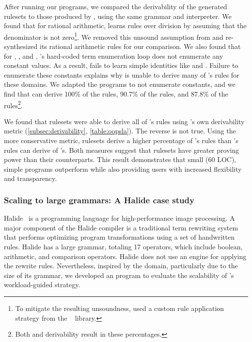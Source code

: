 After running our \enumo programs,
we compared the derivability of the generated rulesets
to those produced by ,
using the same grammar and interpreter.
We found that for rational arithmetic,
   learns rules over division by assuming that
  the denominator is not zero\footnote{To mitigate the resulting
  unsoundness,  used a custom rule application
  strategy from the \egg~\citep{egg} library.}.
We removed this unsound
  assumption from  and re-synthesized its
  rational arithmetic rules for our comparison.
We also found that for , , and , 's hard-coded
  term enumeration loop does not enumerate any constant values.
As a result,  fails to learn simple identities like 
  and .
Failure to enumerate these constants explains why  is unable to derive
  many of \enumo's rules for these domains.
We adapted the \enumo programs to not enumerate constants, and we find that
   can derive 100\% of the  rules, 90.7\% of the  rules,
  and 87.8\% of the  rules\footnote{Both \lhs and \lhsandrhs derivability
  result in these percentages.}.

We found that \enumo rulesets were able to derive
  all of 's rules using 's
  own \lhsandrhs derivability metric
  (\autoref{subsec:derivability}, \autoref{table:oopsla}).
The reverse is not true.
Using the more conservative \lhs metric, \enumo rulesets derive
  a higher percentage of 's rules than 's rules can derive of
  \enumo's.
Both measures suggest that \enumo rulesets have greater proving power
  than their  counterparts.
This result demonstrates that small (\C{<}60 LOC), simple
\enumo programs outperform  while also providing users
with increased flexibility and transparency.

\subsubsection{Scaling to large grammars: A Halide case study}
\label{subsec:halideeval}
Halide~\citep{halide} is a programming language
  for high-performance
  image processing.
A major component of the Halide compiler is
  a traditional term rewriting
  system~\citep{julie-halide} that performs optimizing
  program transformations using a set of handwritten rules.
Halide has a large grammar, totaling 17 operators,
  which include boolean,
  arithmetic, and
  comparison operators.
Halide does not use an \eqsat engine
  for applying the rewrite rules.
Nevertheless, inspired by the domain,
  particularly due to the size of its grammar,
  we developed an \enumo program to evaluate
  the scalability of \enumo's workload-guided strategy.

